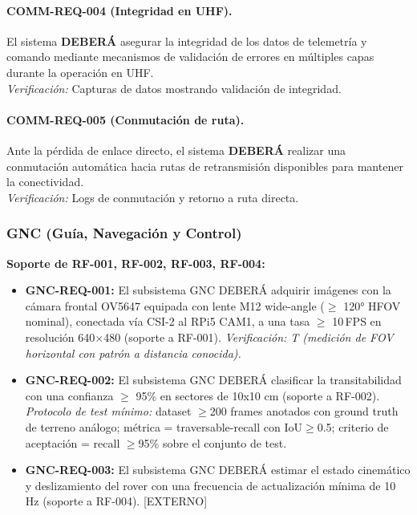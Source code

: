 \paragraph{COMM-REQ-004 (Integridad en UHF).}
El sistema \textbf{DEBERÁ} asegurar la integridad de los datos de telemetría y comando mediante mecanismos de validación de errores en múltiples capas durante la operación en UHF. \\
\textit{Verificación:} Capturas de datos mostrando validación de integridad.

\paragraph{COMM-REQ-005 (Conmutación de ruta).}
Ante la pérdida de enlace directo, el sistema \textbf{DEBERÁ} realizar una conmutación automática hacia rutas de retransmisión disponibles para mantener la conectividad. \\
\textit{Verificación:} Logs de conmutación y retorno a ruta directa.

\subsubsection{GNC (Guía, Navegación y Control)}
\textbf{Soporte de RF-001, RF-002, RF-003, RF-004:}
\begin{itemize}
    \item \textbf{GNC-REQ-001:} El subsistema GNC DEBERÁ adquirir imágenes con la cámara frontal OV5647 equipada con lente M12 wide-angle ($\ge$ 120° HFOV nominal), conectada vía CSI-2 al RPi5 CAM1, a una tasa $\ge$ 10\,FPS en resolución 640$\times$480 (soporte a RF-001). \emph{Verificación: T (medición de FOV horizontal con patrón a distancia conocida).}
    \item \textbf{GNC-REQ-002:} El subsistema GNC DEBERÁ clasificar la transitabilidad con una confianza $\ge$ 95\% en sectores de 10x10 cm (soporte a RF-002). \\
    \textit{Protocolo de test mínimo:} dataset $\ge$200 frames anotados con ground truth de terreno análogo; métrica = traversable-recall con IoU$\ge$0.5; criterio de aceptación = recall $\ge$95\% sobre el conjunto de test.
    \item \textbf{GNC-REQ-003:} El subsistema GNC DEBERÁ estimar el estado cinemático y deslizamiento del rover con una frecuencia de actualización mínima de 10 Hz (soporte a RF-004). [EXTERNO]
\end{itemize}

